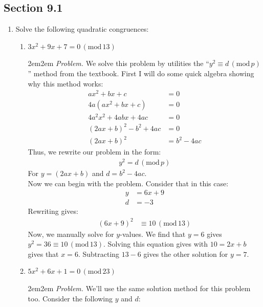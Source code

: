 \documentclass[10pt,oneside]{book}
\newcommand{\gspc}{\vspace{0.13cm}} %
\newcommand{\gline}{\gspc\\} %
\newcommand{\gmod}[1]{\,(\text{mod}\,#1)}
\let\endoldproof\endproof
\newenvironment{problem}[1]
  {\vspace{-0.1cm}\begin{coloredadjust}\begin{adjustwidth}{2em}{2em}
   \textit{Problem. }#1}
  {\endoldproof
\end{adjustwidth}\end{coloredadjust}\gspc}
\begin{document}
\newcommand{\cg}[1]{\color{OliveGreen}#1\color{white}}
\newcommand{\cb}[1]{\color{BlueViolet}#1\color{white}}

\subsection*{Section 9.1}

\begin{enumerate}
	\item Solve the following quadratic congruences:
	\begin{enumerate}
		\item [(b)]$3x^2 + 9x + 7 = 0 \gmod{13}$
    \begin{problem}
      We solve this problem by utilities the ``$y^2\equiv d\gmod{p}$'' method from the textbook. First I will do some quick algebra showing why this method works:
      \begin{align*}
        ax^2 + bx + c &= 0\\
        4a(ax^2+bx + c) &= 0\\
        4a^2x^2+4abx + 4ac &= 0\\
        (2ax+b)^2 - b^2 + 4ac &= 0\\
        (2ax+b)^2 &= b^2 - 4ac
      \end{align*}
      Thus, we rewrite our problem in the form:
      \begin{align*}
        y^2 = d \gmod{p}
      \end{align*}
      For $y = (2ax+b)$ and $d = b^2-4ac$.\gline
      Now we can begin with the problem. Consider that in this case:
      \begin{align*}
        y &= 6x + 9\\
        d&= -3
      \end{align*}
      Rewriting gives:
      \begin{align*}
        (6x+9)^2 &\equiv 10 \gmod{13}
      \end{align*}
      Now, we manually solve for $y$-values. We find that $y = 6$ gives $y^2 = 36 \equiv 10 \gmod{13}$. Solving this equation gives with $10 = 2x + b$ gives that $x = 6$. Subtracting $13 - 6$ gives the other solution for $y = 7$.  
    \end{problem}
		\item [(c)]$5x^2 + 6x + 1=0\gmod {23}$
    \begin{problem}
      We'll use the same solution method for this problem too. Consider the following $y$ and $d$:
      \begin{align*}

\end{align*}
\end{problem}
\end{enumerate}
\end{enumerate}
\end{document}
